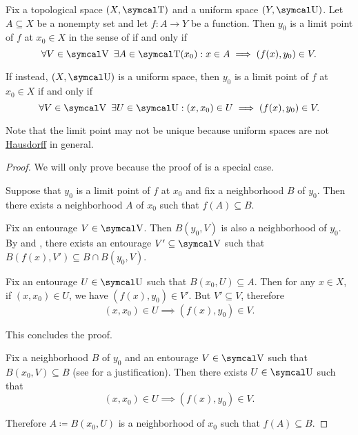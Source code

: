 \begin{proposition}\label{thm:uniform_space_local_convergence}
  Fix a topological space \( (X, \CT) \) and a uniform space \( (Y, \CU) \). Let \( A \subseteq X \) be a nonempty set and let \( f: A \to Y \) be a function. Then \( y_0 \) is a limit point of \( f \) at \( x_0 \in X \) in the sense of  if and only if
  \begin{equation}\label{thm:uniform_space_local_convergence/topological_source}
    \forall V \in \CV \ \exists A \in \CT(x_0) : x \in A \implies (f(x), y_0) \in V.
  \end{equation}

  If instead, \( (X, \CU) \) is a uniform space, then \( y_0 \) is a limit point of \( f \) at \( x_0 \in X \) if and only if
  \begin{equation}\label{thm:uniform_space_local_convergence/uniform_source}
    \forall V \in \CV \ \exists U \in \CU : (x, x_0) \in U \implies (f(x), y_0) \in V.
  \end{equation}

  Note that the limit point may not be unique because uniform spaces are not \hyperref[def:separation_axioms/T2]{Hausdorff} in general.
\end{proposition}
\begin{proof}
  We will only prove  because the proof of  is a special case.

  \Sufficiency Suppose that \( y_0 \) is a limit point of \( f \) at \( x_0 \) and fix a neighborhood \( B \) of \( y_0 \). Then there exists a neighborhood \( A \) of \( x_0 \) such that \( f(A) \subseteq B \).

  Fix an entourage \( V \in \CV \). Then \( B(y_0, V) \) is also a neighborhood of \( y_0 \). By  and , there exists an entourage \( V' \subseteq \CV \) such that \( B(f(x), V') \subseteq B \cap B(y_0, V) \).

  Fix an entourage \( U \in \CU \) such that \( B(x_0, U) \subseteq A \). Then for any \( x \in X \), if \( (x, x_0) \in U \), we have \( (f(x), y_0) \in V' \). But \( V' \subseteq V \), therefore
  \begin{equation*}
    (x, x_0) \in U \implies (f(x), y_0) \in V.
  \end{equation*}

  This concludes the proof.

  \Necessity Fix a neighborhood \( B \) of \( y_0 \) and an entourage \( V \in \CV \) such that \( B(x_0, V) \subseteq B \) (see  for a justification). Then there exists \( U \in \CU \) such that
  \begin{equation*}
    (x, x_0) \in U \implies (f(x), y_0) \in V.
  \end{equation*}

  Therefore \( A \coloneqq B(x_0, U) \) is a neighborhood of \( x_0 \) such that \( f(A) \subseteq B \).
\end{proof}

